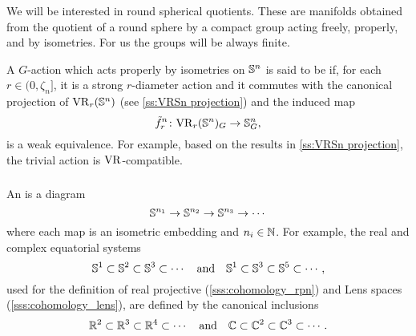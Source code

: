 \subsubsection{}\label{subsub:VR-compatible-Sn}

We will be interested in round spherical quotients.
These are manifolds obtained from the quotient of a round sphere by a compact group acting freely, properly, and by isometries.
For us the groups will be always finite.

A \(G\)-action which acts properly by isometries on \(\mathbb{S}^n\)  is said to be  if, for each $r \in (0, \zeta_n]$, it is a strong $r$-diameter action and it commutes with the canonical projection of \(\mathrm{VR}_r(\mathbb{S}^n)\) (see \cref{ss:VRSn projection}) and the induced map
\[
\tilde f_r^n \colon \mathrm{VR}_r(\mathbb{S}^n)_G \to \mathbb{S}^n_G,
\]
is a weak equivalence.
For example, based on the results in \cref{ss:VRSn projection}, the trivial action is \(\mathrm{VR}\)-compatible.


\subsubsection{}\label{subsub:VR-compatible-system}

An  is a diagram
\[
\mathbb{S}^{n_1} \to \mathbb{S}^{n_2} \to \mathbb{S}^{n_3} \to \dotsb
\]
where each map is an isometric embedding and $n_i \in \mathbb{N}$.
For example, the real and complex equatorial systems
\[
\mathbb{S}^1 \subset \mathbb{S}^2 \subset \mathbb{S}^3 \subset \dotsb
\quad\text{and}\quad
\mathbb{S}^1 \subset \mathbb{S}^3 \subset \mathbb{S}^5 \subset \dotsb,
\]
used for the definition of real projective (\cref{sss:cohomology_rpn}) and Lens spaces (\cref{sss:cohomology_lens}), are defined by the canonical inclusions
\[
\mathbb{R}^2 \subset \mathbb{R}^3 \subset \mathbb{R}^4 \subset \dotsb
\quad\text{and}\quad
\mathbb{C} \subset \mathbb{C}^2 \subset \mathbb{C}^3 \subset \dotsb.
\]

\subsubsection{}\label{subsub:system VR compatible}

